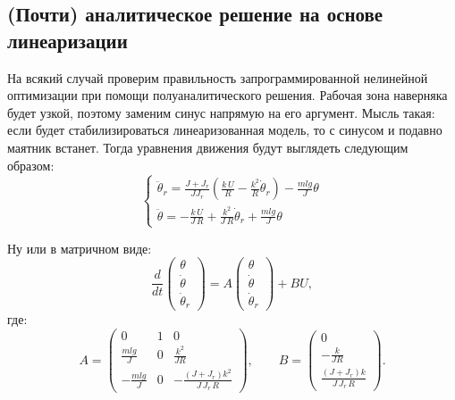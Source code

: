 \documentclass{article}
\begin{document}
\subsection{(Почти) аналитическое решение на основе линеаризации}\label{sec:wheelSize:linear}

На всякий случай проверим правильность запрограммированной нелинейной оптимизации при помощи полуаналитического решения.
Рабочая зона наверняка будет узкой, поэтому заменим синус напрямую на его аргумент. Мысль такая: если будет стабилизироваться линеаризованная модель, то с синусом и подавно маятник встанет. Тогда уравнения движения будут выглядеть следующим образом:
$$
\left\{
\begin{array}{l}
\ddot\theta_r = \frac{J+J_r}{J J_r}(\frac{k\,U}{R} - \frac{k^2}{R}\dot\theta_r)  - \frac{mlg}{J}\theta\\
\ddot \theta  = -\frac{k\,U}{J\,R} + \frac{k^2}{J\,R}\dot\theta_r + \frac{mlg}{J}\theta
\end{array}
\right.
$$

Ну или в матричном виде: 
$$
\frac{d}{dt}\begin{pmatrix}\theta \\ \dot\theta \\ \dot\theta_r \end{pmatrix} = A \begin{pmatrix}\theta \\ \dot\theta \\ \dot\theta_r \end{pmatrix} + B U,
$$
где:
$$
A= \begin{pmatrix} 0 & 1 & 0 \\ \frac{mlg}{J} & 0 & \frac{k^2}{JR} \\ -\frac{mlg}{J} & 0 & -\frac{(J+J_r)k^2}{J\,J_r\,R} \end{pmatrix},
\qquad 
B=\begin{pmatrix}0\\ -\frac{k}{JR} \\ \frac{(J+J_r)k}{J\,J_r\,R} \end{pmatrix}.
$$
\end{document}
